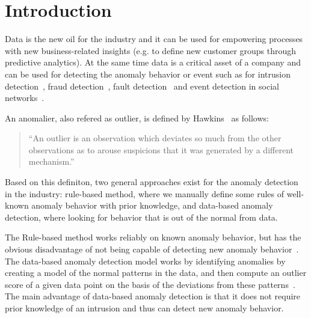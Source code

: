 \section{Introduction}\label{sec-intro}

Data is the new oil for the industry and
it can be used for empowering processes with
new business-related insights
(e.g. to define new customer groups through predictive analytics).
At the same time data is a critical asset of a company and
can be used for detecting the anomaly behavior or event
such as for
intrusion detection~\cite{garcia2009anomaly},
fraud detection~\cite{bolton2002statistical},
fault detection~\cite{hwang2009survey} and
event detection in social networks~\cite{sakaki2010earthquake}.

An anomalier,
also refered as outlier, 
is defined by Hawkins~\cite{hawkins1980identification}
as follows: 
\begin{quotation}
``An outlier is an observation which
deviates so much from the other observations
as to arouse suspicions that
it was generated by a different mechanism.''
\end{quotation}
Based on this definiton,
two general approaches exist for the anomaly
detection in the industry:
rule-based method,
where we manually define some rules of
well-known anomaly behavior
with prior knowledge,
and data-based anomaly detection,
where looking for behavior that
is out of the normal from data.

The Rule-based method works reliably on known anomaly behavior,
but has the obvious disadvantage of not being capable of
detecting new anomaly behavior~\cite{}.
The data-based anomaly detection model works by
identifying anomalies by creating a model of
the normal patterns in the data,
and then compute an outlier score of a given data point
on the basis of the deviations from these patterns~\cite{chandola2009anomaly}.
The main advantage of data-based anomaly detection is that
it does not require prior knowledge of an intrusion and
thus can detect new anomaly behavior.

